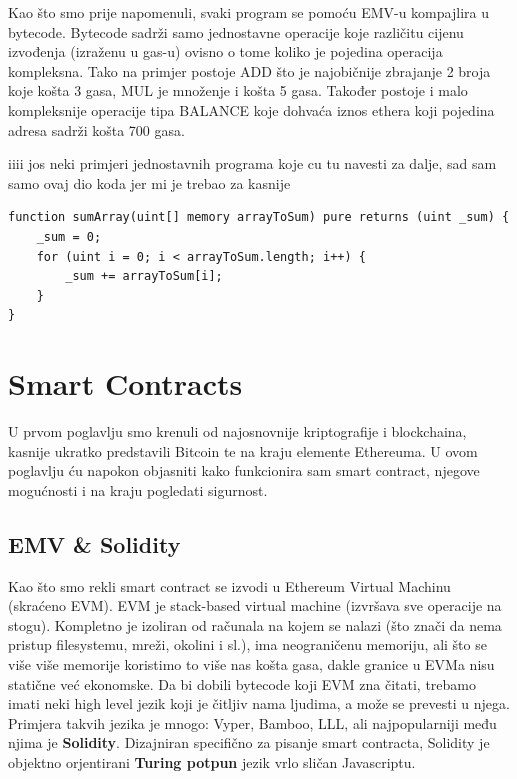 \documentclass[12pt]{report}
\begin{document}
Kao što smo prije napomenuli, svaki program se pomoću EMV-u kompajlira u bytecode. Bytecode sadrži samo jednostavne operacije koje različitu cijenu izvođenja (izraženu u gas-u) ovisno o tome koliko je pojedina operacija kompleksna. Tako na primjer postoje ADD što je najobičnije zbrajanje 2 broja koje košta 3 gasa, MUL je množenje i košta 5 gasa. Također postoje i malo kompleksnije operacije tipa BALANCE koje dohvaća iznos ethera koji pojedina adresa sadrži košta 700 gasa.

iiii jos neki primjeri jednostavnih programa koje cu tu navesti za dalje, sad sam samo ovaj dio koda jer mi je trebao za kasnije

\begin{minipage}{\linewidth}
\begin{lstlisting}[caption = Primjer 1, language=solidity, label={lst:suma}]
function sumArray(uint[] memory arrayToSum) pure returns (uint _sum) {
    _sum = 0;
    for (uint i = 0; i < arrayToSum.length; i++) {
        _sum += arrayToSum[i];
    }
}
\end{lstlisting}
\end{minipage}

\chapter{Smart Contracts}

U prvom poglavlju smo krenuli od najosnovnije kriptografije i blockchaina, kasnije ukratko predstavili Bitcoin te na kraju elemente Ethereuma. U ovom poglavlju ću napokon objasniti kako funkcionira sam smart contract, njegove mogućnosti i na kraju pogledati sigurnost.

\section{EMV \& Solidity}

Kao što smo rekli smart contract se izvodi u Ethereum Virtual Machinu (skraćeno EVM). EVM je stack-based virtual machine (izvršava sve operacije na stogu). Kompletno je izoliran od računala na kojem se nalazi (što znači da nema pristup filesystemu, mreži, okolini i sl.), ima neograničenu memoriju, ali što se više više memorije koristimo to više nas košta gasa, dakle granice u EVMa nisu statične već ekonomske. Da bi dobili bytecode koji EVM zna čitati, trebamo imati neki high level jezik koji je čitljiv nama ljudima, a može se prevesti u njega. Primjera takvih jezika je mnogo: Vyper, Bamboo, LLL, ali najpopularniji među njima je \textbf{Solidity}. Dizajniran specifično za pisanje smart contracta, Solidity je objektno orjentirani \textbf{Turing potpun} jezik vrlo sličan Javascriptu.
\end{document}
